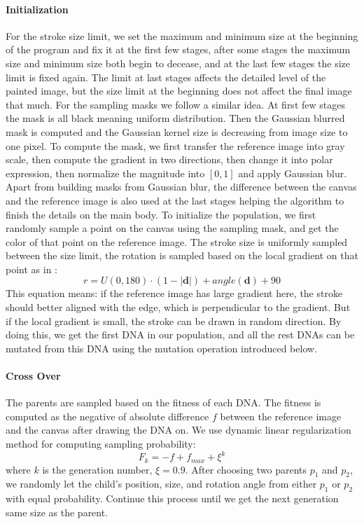 \documentclass[a4paper,conference]{IEEEtran}
\begin{document}
\paragraph{Initialization} For the stroke size limit, we set the maximum and minimum size at the beginning of the program and fix it at the first few stages, after some stages the maximum size and minimum size both begin to decease, and at the last few stages the size limit is fixed again. The limit at last stages affects the detailed level of the painted image, but the size limit at the beginning does not affect the final image that much. For the sampling masks we follow a similar idea. At first few stages the mask is all black meaning uniform distribution. Then the Gaussian blurred mask is computed and the Gaussian kernel size is decreasing from image size to one pixel. To compute the mask, we first transfer the reference image into gray scale, then compute the gradient in two directions, then change it into polar expression, then normalize the magnitude into $[0,1]$ and apply Gaussian blur. Apart from building masks from Gaussian blur, the difference between the canvas and the reference image is also used at the last stages helping the algorithm to finish the details on the main body. To initialize the population, we first randomly sample a point on the canvas using the sampling mask, and get the color of that point on the reference image. The stroke size is uniformly sampled between the size limit, the rotation is sampled based on the local gradient on that point as in \cite{genetic-drawing}:
\begin{equation}
    r = U(0, 180)\cdot (1-|\bm{d}|) + angle(\bm{d}) + 90
\end{equation}
This equation means: if the reference image has large gradient here, the stroke should better aligned with the edge, which is perpendicular to the gradient. But if the local gradient is small, the stroke can be drawn in random direction. By doing this, we get the first DNA in our population, and all the rest DNAs can be mutated from this DNA using the mutation operation introduced below.

\paragraph{Cross Over} The parents are sampled based on the fitness of each DNA. The fitness is computed as the negative of absolute difference $f$ between the reference image and the canvas after drawing the DNA on. We use dynamic linear regularization method for computing sampling probability:
\begin{equation}
    F_k = -f + f_{max} + \xi^k
\end{equation}
where $k$ is the generation number, $\xi=0.9$. After choosing two parents $p_1$ and $p_2$, we randomly let the child's position, size, and rotation angle from either $p_1$ or $p_2$ with equal probability. Continue this process until we get the next generation same size as the parent.
\end{document}
